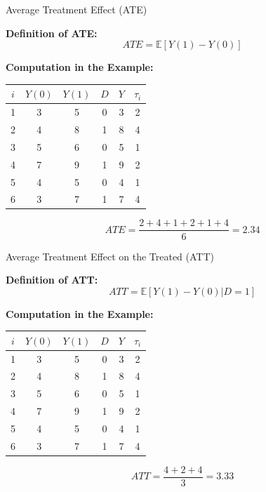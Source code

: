 \documentclass[xcolor=svgnames,t]{beamer}
\begin{document}
\begin{frame}{Average Treatment Effect (ATE)}

    \textbf{Definition of ATE:}
    \[
    ATE = \mathbb{E}[Y(1) - Y(0)]
    \]
   
    \vspace{0.5cm}
    \pause
    \textbf{Computation in the Example:}
    
    \centering
    \begin{table}[]
    \centering
    \begin{tabular}{|c|c|c|c|c|c|}
    \hline
    \( i \) & \( Y(0) \) & \( Y(1) \) & \( D \) & \( Y \) & \( \tau_i \) \\ \hline
    1 & 3  & 5  & 0 & 3 &\cellcolor{blue!20} 2 \\ \hline
    2 & 4  & 8  & 1 & 8 & \cellcolor{blue!20} 4 \\ \hline
    3 & 5  & 6  & 0 & 5 & \cellcolor{blue!20}1 \\ \hline
    4 & 7  & 9  & 1 & 9 & \cellcolor{blue!20} 2 \\ \hline
    5 & 4  & 5  & 0 & 4 & \cellcolor{blue!20}1 \\ \hline
    6 & 3  & 7  & 1 & 7 & \cellcolor{blue!20} 4 \\ \hline
    \end{tabular}
    \end{table}
    \pause
    \vspace{0.3cm}
    \[
        ATE = \frac{2 + 4 + 1 + 2 + 1 + 4}{6} = 2.34
        \]

\end{frame}

\begin{frame}{Average Treatment Effect on the Treated (ATT)}

    \textbf{Definition of ATT:}
    \[
    ATT = \mathbb{E}[Y(1) - Y(0) | D = 1]
    \]
    \pause
      
    \textbf{Computation in the Example:}
    
    \centering
    \begin{table}[]
    \centering
    \begin{tabular}{|c|c|c|c|c|c|}
    \hline
    \( i \) & \( Y(0) \) & \( Y(1) \) & \( D \) & \( Y \) & \( \tau_i \) \\ \hline
    1 & 3  & 5  & 0 & 3 & 2 \\ \hline
    \rowcolor{blue!20} 2 & 4  & 8  & 1 & 8 & 4 \\ \hline
    3 & 5  & 6  & 0 & 5 & 1 \\ \hline
    \rowcolor{blue!20} 4 & 7  & 9  & 1 & 9 & 2 \\ \hline
    5 & 4  & 5  & 0 & 4 & 1 \\ \hline
    \rowcolor{blue!20} 6 & 3  & 7  & 1 & 7 & 4 \\ \hline
    \end{tabular}
    \end{table}
    \pause
    \vspace{0.3cm}
    \[
        ATT = \frac{4 + 2 + 4}{3} = 3.33
    \]

\end{frame}
\end{document}
